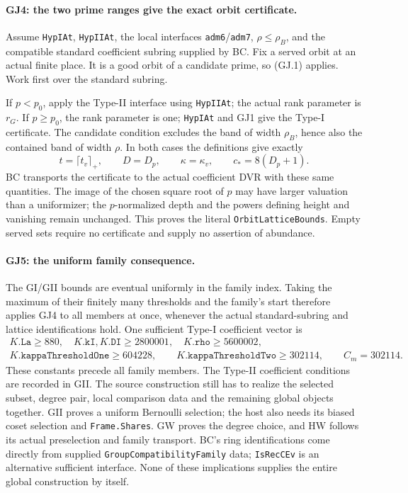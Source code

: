 \paragraph{GJ4: the two prime ranges give the exact orbit certificate.}
Assume \texttt{HypIAt}, \texttt{HypIIAt}, the local interfaces
\texttt{adm6}/\texttt{adm7}, $\rho\le\rho_B$, and the compatible
standard coefficient subring supplied by BC. Fix a served orbit at an
actual finite place. It is a good orbit of a candidate prime, so (GJ.1)
applies. Work first over the standard subring.

If $p<p_0$, apply the Type-II interface using \texttt{HypIIAt}; the
actual rank parameter is $r_G$. If $p\ge p_0$, the rank parameter is
one; \texttt{HypIAt} and GJ1 give the Type-I certificate. The candidate
condition excludes the band of width $\rho_B$, hence also the contained
band of width $\rho$. In both cases the definitions give exactly
\[
 t=\lceil t_v\rceil_+,\qquad D=D_p,\qquad
 \kappa=\kappa_v,\qquad c_*=8(D_p+1).                 \tag{GJ.2}
\]
BC transports the certificate to the actual coefficient DVR with
these same quantities. The image of the chosen square root of $p$
may have larger valuation than a uniformizer; the $p$-normalized
depth and the powers defining height and vanishing remain unchanged.
This proves the literal \texttt{OrbitLatticeBounds}. Empty served sets
require no certificate and supply no assertion of abundance.

\paragraph{GJ5: the uniform family consequence.}
The GI/GII bounds are eventual uniformly in the family index. Taking
the maximum of their finitely many thresholds and the family's start
therefore applies GJ4 to all members at once, whenever the actual
standard-subring and lattice identifications hold. One sufficient
Type-I coefficient vector is
\[
\begin{gathered}
 K.\texttt{La}\ge880,\quad K.\texttt{kI},K.\texttt{DI}\ge2800001,
 \quad K.\texttt{rho}\ge5600002,\\
 K.\texttt{kappaThresholdOne}\ge604228,\qquad
 K.\texttt{kappaThresholdTwo}\ge302114,\qquad C_m=302114.
\end{gathered}                                                   \tag{GJ.3}
\]
These constants precede all family members. The Type-II coefficient
conditions are recorded in GII. The source construction still has to
realize the selected subset, degree pair, local comparison data and the
remaining global objects together. GII proves a uniform Bernoulli
selection; the host also needs its biased coset selection and
\texttt{Frame.Shares}. GW proves the degree choice, and HW follows its
actual preselection and family transport. BC's ring identifications
come directly from supplied \texttt{GroupCompatibilityFamily} data;
\texttt{IsRecCEv} is an alternative sufficient interface. None of these
implications supplies the entire global construction by itself.

